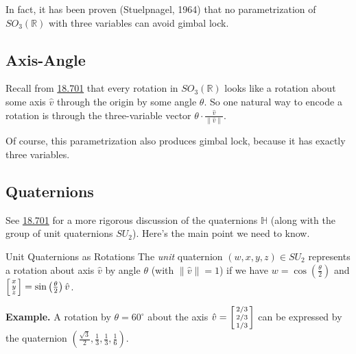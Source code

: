 In fact, it has been proven (Stuelpnagel, 1964)
that no parametrization of $SO_3(\mathbb{R})$ with three variables
can avoid gimbal lock.

\subsection{Axis-Angle}

Recall from \href{/18.701/lectures/9/#orthogonal-groups}{18.701}
that every rotation in $SO_3(\mathbb{R})$ looks like
a rotation about some axis $\hat{v}$ through the origin
by some angle $\theta$.
So one natural way to encode a rotation
is through the three-variable vector
$\theta \cdot \frac{\hat{v}}{\|\hat{v}\|}$.

Of course, this parametrization also produces gimbal lock,
because it has exactly three variables.

\subsection{Quaternions}

See \href{/18.701/lectures/20}{18.701} for
a more rigorous discussion of the quaternions $\mathbb{H}$
(along with the group of unit quaternions $SU_2$).
Here's the main point we need to know.

\begin{theorem}{Unit Quaternions as Rotations}
    The \emph{unit} quaternion $(w, x, y, z) \in SU_2$
    represents a rotation about axis $\hat{v}$ by angle $\theta$
    (with $\|\hat{v}\| = 1$)
    if we have $w = \cos\left(\frac{\theta}{2}\right)$
    and $\begin{bsmallmatrix} x \\ y \\ z \end{bsmallmatrix}
    = \sin\left(\frac{\theta}{2}\right) \hat{v}$.
\end{theorem}

\textbf{Example.}
A rotation by $\theta = 60^{\circ}$ about the axis
$\hat{v} = \begin{bsmallmatrix} 2/3 \\ 2/3 \\ 1/3 \end{bsmallmatrix}$
can be expressed by the quaternion
$\left(\frac{\sqrt{3}}{2}, \frac{1}{3}, \frac{1}{3}, \frac{1}{6}\right)$.

